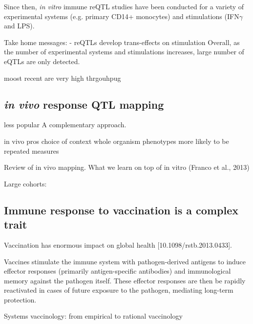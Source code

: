 \begin{outline}

Since then, \textit{in vitro} immune reQTL studies have been conducted for a variety of experimental systems (e.g. primary CD14+ monocytes\autocite{fairfax2014InnateImmuneActivity}) and stimulations (IFN$\gamma$ and LPS\autocite{fairfax2014GeneticsGeneExpression}).

Take home messages:
- reQTLs develop trans-effects on stimulation \autocite{fairfax2014InnateImmuneActivity}
Overall, as the number of experimental systems and stimulations increases, large number of eQTLs are only detected.

moost recent are very high thrgouhpug

\subsection{\textit{in vivo} response QTL mapping}

less popular
A complementary approach.

in vivo pros
    choice of context 
    whole organism phenotypes
    more likely to be repeated measures

Review of in vivo mapping.
What we learn on top of in vitro
(Franco et al., 2013)

Large cohorts: 

\subsection{Immune response to vaccination is a complex trait}

Vaccination has enormous impact on global health [10.1098/rstb.2013.0433].

Vaccines stimulate the immune system with pathogen-derived antigens to induce effector responses (primarily antigen-specific antibodies) and immunological memory against the pathogen itself.
These effector responses are then be rapidly reactivated in cases of future exposure to the pathogen, mediating long-term protection.

Systems vaccinology: from empirical to rational vaccinology



\end{outline}
